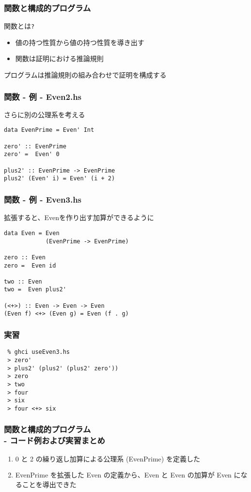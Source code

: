 \documentclass[cjk,dvipdfm,14pt]{beamer}
\begin{document}
\begin{frame}[fragile]
\frametitle{関数と構成的プログラム}

関数とは\verb|?|
\begin{itemize}
\item 値の持つ性質から値の持つ性質を導き出す
\item 関数は証明における推論規則
\end{itemize}

{ \color{red} プログラムは推論規則の組み合わせで証明を構成する }

\end{frame}

\begin{frame}[fragile]
\frametitle{関数 - 例 - Even2.hs}

さらに別の公理系を考える
\begin{lstlisting}
data EvenPrime = Even' Int

zero' :: EvenPrime
zero' =  Even' 0

plus2' :: EvenPrime -> EvenPrime
plus2' (Even' i) = Even' (i + 2)
\end{lstlisting}

\end{frame}

\begin{frame}[fragile]
\frametitle{関数 - 例 - Even3.hs}

拡張すると、Evenを作り出す加算ができるように
\begin{lstlisting}
data Even = Even
            (EvenPrime -> EvenPrime)

zero :: Even
zero =  Even id

two :: Even
two =  Even plus2'

(<+>) :: Even -> Even -> Even
(Even f) <+> (Even g) = Even (f . g)
\end{lstlisting}

\end{frame}

\begin{frame}[fragile]
\frametitle{実習}

\begin{lstlisting}
 % ghci useEven3.hs
 > zero'
 > plus2' (plus2' (plus2' zero'))
 > zero
 > two
 > four
 > six
 > four <+> six
\end{lstlisting}

\end{frame}

\begin{frame}[fragile]
\frametitle{関数と構成的プログラム \\- コード例および実習まとめ}

\begin{enumerate}
\item 0 と 2 の繰り返し加算による公理系 (EvenPrime) を定義した
\item EvenPrime を拡張した Even の定義から、Even と Even の加算が Even になることを導出できた
\end{enumerate}

\end{frame}
\end{document}

